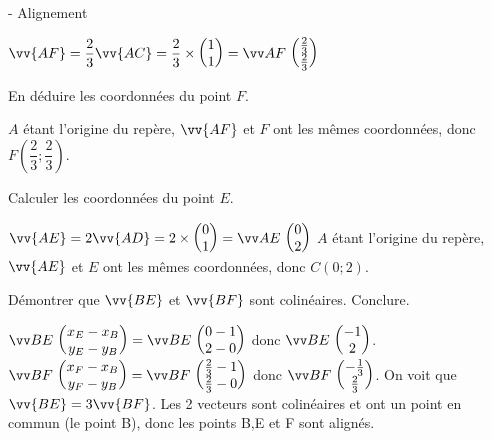 \documentclass[11pt,a4paper]{article}  %
\begin{document}
\begin{exercice}{ - Alignement}
\begin{enumMet}[resume]
		\begin{corrBox}
			$\vv {AF} = \dfrac{2}{3} \vv {AC}=\dfrac{2}{3}\times \CoordSV{1}{1}=\Coord{AF}{\frac{2}{3}}{\frac{2}{3}}$	
		\end{corrBox}
		\item En déduire les coordonnées du point $F$.
		\begin{corrBox}
			$A$ étant l'origine du repère, $\vv{AF}$ et $F$ ont les mêmes coordonnées, donc $F\left(\dfrac{2}{3};\dfrac{2}{3}\right)$.	
		\end{corrBox}
		\item Calculer les coordonnées du point $E$.
		\begin{corrBox}
			$\vv {AE} = 2 \vv {AD}=2\times \CoordSV{0}{1}=\Coord{AE}{0}{2}$	
			$A$ étant l'origine du repère, $\vv{AE}$ et $E$ ont les mêmes coordonnées, donc $C(0;2)$.
		\end{corrBox}
		\item Démontrer que $\vv{BE}$ et $\vv{BF}$ sont colinéaires. Conclure.
		\begin{corrBox}
		$\Coord{BE}{x_E-x_B}{y_E-y_B}=\Coord{BE}{0-1}{2-0}$ donc $\Coord{BE}{-1}{2}$.\\
		$\Coord{BF}{x_F-x_B}{y_F-y_B}=\Coord{BF}{\frac{2}{3}-1}{\frac{2}{3}-0}$ donc $\Coord{BF}{-\frac{1}{3}}{\frac{2}{3}}$.
		On voit que $\vv{BE}=3\vv{BF}$. Les 2 vecteurs sont colinéaires et ont un point en commun (le point B), donc les points B,E et F sont alignés.	
		\end{corrBox}
	\end{enumMet}
\end{exercice}
\newpage
\end{document}
